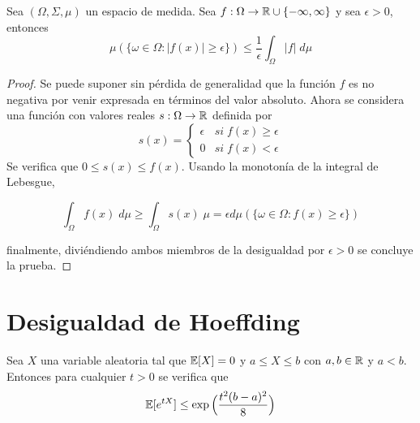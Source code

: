     \begin{lema}
    Sea $(\Omega,\Sigma,\mu)$ un espacio de medida. Sea ${f:\Omega \to \mathbb{R}\cup\{-\infty,\infty\}}$ y sea $\epsilon >0$, entonces
    \begin{equation}
        \mu(\{ \omega \in \Omega : |f(x)| \geq \epsilon \}) \leq \frac{1}{\epsilon} \int_\Omega |f| \; d\mu
    \end{equation}
    \end{lema}

    \begin{proof}
    Se puede suponer sin pérdida de generalidad que la función $f$ es no negativa por venir expresada en términos del valor absoluto. Ahora se considera una función con valores reales $s:\Omega \to \mathbb{R}$ definida por
    \begin{equation}
        s(x) = \left\{
            \begin{array}{cc}
                 \epsilon & si \; f(x) \geq \epsilon  \\
                 0 & si\; f(x) < \epsilon 
            \end{array}
        \right.
    \end{equation}
    \noindent Se verifica que $0 \leq s(x) \leq f(x)$. Usando la monotonía de la integral de Lebesgue,
    
    \begin{equation}
        \int_\Omega f(x) \; d\mu \geq \int_\Omega s(x) \; \mu = \epsilon d\mu(\{\omega \in \Omega : f(x) \geq \epsilon \})
    \end{equation}
    
    \noindent finalmente, diviéndiendo ambos miembros de la desigualdad por $\epsilon > 0$ se concluye la prueba.
    \end{proof}

\section{Desigualdad de Hoeffding}
    \begin{lema}\label{lema:Hoeffding}
    Sea $X$ una variable aleatoria tal que ${\mathbb{E}[X] = 0}$ y ${a \leq X \leq b}$ con ${a,b \in \mathbb{R}}$ y ${a < b}$. Entonces para cualquier $t>0$ se verifica que 
    \begin{equation}
        \mathbb{E}[e^{tX}] \leq \exp{\Big(\frac{t^2(b-a)^2}{8}\Big)}
    \end{equation}
    \end{lema}
    
